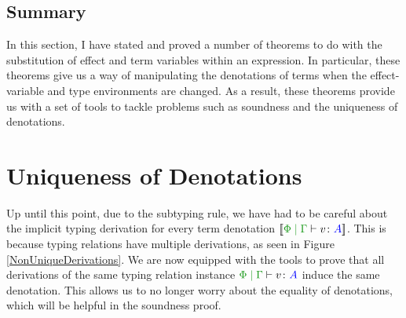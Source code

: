 \documentclass{Report}
\begin{document}
\subsection{Summary}
In this section, I have stated and proved a number of theorems to do with the substitution of effect and term variables within an expression. In particular, these theorems give us a way of manipulating the denotations of terms when the effect-variable and type environments are changed. As a result, these theorems provide us with a set of tools to tackle problems such as soundness and the uniqueness of denotations.

\section{Uniqueness of Denotations}\label{UniqueDenotations}

Up until this point, due to the subtyping rule, we have had to be careful about the implicit typing derivation for every term denotation $\deno{\gpetyperelation{v}{A}}$. This is because typing relations have multiple derivations, as seen in Figure \ref{NonUniqueDerivations}. We are now equipped with the tools to prove that all derivations of the same typing relation instance $\gpetyperelation{v}{A}$ induce the same denotation. This allows us to no longer worry about the equality of denotations, which will be helpful in the soundness proof.
\end{document}
